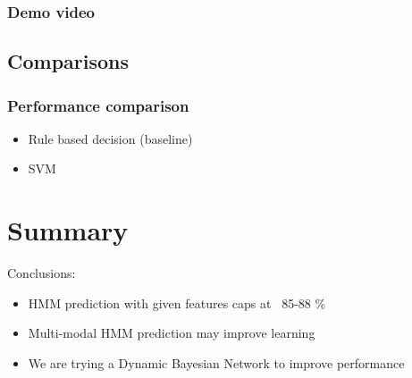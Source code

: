 \documentclass{beamer}
\begin{document}
\begin{frame}

\frametitle{Demo video}

\end{frame}

\subsection[Comparisons]{Comparisons}
\begin{frame}
\frametitle{Performance comparison}
\begin{itemize}
  \item Rule based decision (baseline)
  \item SVM
\end{itemize}

\end{frame}

\section{Summary}
\begin{frame}
	Conclusions:
	\begin{itemize}
	  \item HMM prediction with given features caps at ~85-88 \%
	  \item Multi-modal HMM prediction may improve learning
	  \item We are trying a Dynamic Bayesian Network to improve performance
	\end{itemize}
\end{frame}
\end{document}
